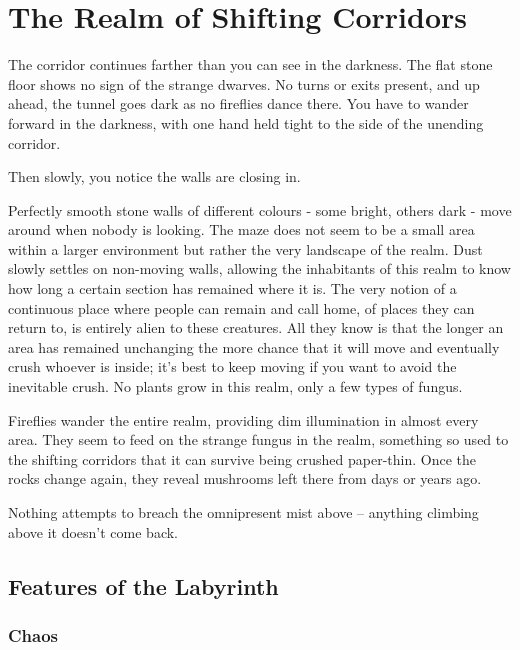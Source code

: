 \section{The Realm of Shifting Corridors}\label{shiftingcorridors}

\begin{multicols}{2}

\begin{boxtext}
	The corridor continues farther than you can see in the darkness.
	The flat stone floor shows no sign of the strange dwarves.
	No turns or exits present, and up ahead, the tunnel goes dark as no fireflies dance there.
	You have to wander forward in the darkness, with one hand held tight to the side of the unending corridor.

	Then slowly, you notice the walls are closing in.

\end{boxtext}

Perfectly smooth stone walls of different colours - some bright, others dark - move around when nobody is looking.  The maze does not seem to be a small area within a larger environment but rather the very landscape of the realm.  Dust slowly settles on non-moving walls, allowing the inhabitants of this realm to know how long a certain section has remained where it is.  The very notion of a continuous place where people can remain and call home, of places they can return to, is entirely alien to these creatures.  All they know is that the longer an area has remained unchanging the more chance that it will move and eventually crush whoever is inside; it's best to keep moving if you want to avoid the inevitable crush.  No plants grow in this realm, only a few types of fungus.

Fireflies wander the entire realm, providing dim illumination in almost every area.  They seem to feed on the strange fungus in the realm, something so used to the shifting corridors that it can survive being crushed paper-thin.  Once the rocks change again, they reveal mushrooms left there from days or years ago.

Nothing attempts to breach the omnipresent mist above -- anything climbing above it doesn't come back.

\subsection{Features of the Labyrinth}

\subsubsection{Chaos}


\end{multicols}
